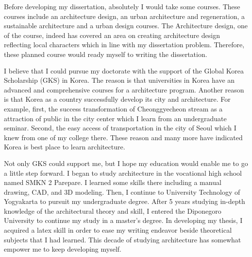 \documentclass[../main.tex]{subfiles}
\begin{document}
\begin{tcolorbox}
	Before developing my dissertation, absolutely I would take some courses. These courses include an architecture design, an urban architecture and regeneration, a sustainable architecture and a urban design courses.
	The Architecture design, one of the course, indeed has covered an area on creating architecture design reflecting local characters which in line with my dissertation problem. Therefore, these planned course would ready myself to writing the dissertation.

	I believe that I could pursue my doctorate with the support of the Global Korea Scholarship (GKS) in Korea. The reason is that universities in Korea have an advanced and comprehensive courses for a architecture program. Another reason is that Korea as a country successfully develop its city and architecture.
	For example, first, the success transformation of Cheonggyecheon stream as a attraction of public in the city center which I learn from an undergraduate seminar.
	Second, the easy access of transportation in the city of Seoul which I knew from one of my college there. These reason and many more have indicated Korea is best place to learn architecture.


	Not only GKS could support me, but I hope my education would enable me to go a little step forward. I began to study architecture in the vocational high school named SMKN 2 Parepare. I learned some skills there including a manual drawing, CAD, and 3D modeling. Then, I continue to University Technology of Yogyakarta to pursuit my undergraduate degree. After 5 years studying in-depth knowledge of the architectural theory and skill, I entered the Diponegoro University to continue my study in a master's degree. In developing my thesis, I acquired a latex skill in order to ease my writing endeavor beside theoretical subjects that I had learned.
	This decade of studying architecture has somewhat empower me to keep developing myself.




\end{tcolorbox}
\end{document}
